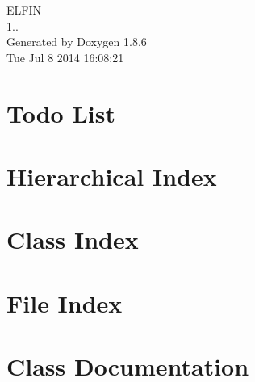 \documentclass[twoside]{book}
\newcommand{\clearemptydoublepage}{%
  \newpage{\pagestyle{empty}\cleardoublepage}%
}
\begin{document}
\hypersetup{pageanchor=false}
\begin{titlepage}
\vspace*{7cm}
\begin{center}%
{\Large E\-L\-F\-I\-N \\[1ex]\large 1.. }\\
\vspace*{1cm}
{\large Generated by Doxygen 1.8.6}\\
\vspace*{0.5cm}
{\small Tue Jul 8 2014 16:08:21}\\
\end{center}
\end{titlepage}
\clearemptydoublepage
\tableofcontents
\clearemptydoublepage
{}
\hypersetup{pageanchor=true}

\chapter{Todo List}
\label{todo}
\hypertarget{todo}{}

\chapter{Hierarchical Index}

\chapter{Class Index}

\chapter{File Index}

\chapter{Class Documentation}
































\end{document}
